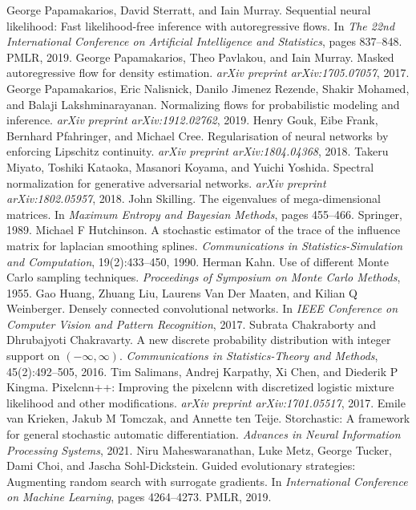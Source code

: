 \begin{chapterreferences}
 George Papamakarios, David Sterratt, and Iain Murray. Sequential neural likelihood: Fast likelihood-free inference with autoregressive flows. In \emph{The 22nd International Conference on Artificial Intelligence and Statistics}, pages 837--848. PMLR, 2019.
 George Papamakarios, Theo Pavlakou, and Iain Murray. Masked autoregressive flow for density estimation. \emph{arXiv preprint arXiv:1705.07057}, 2017.
 George Papamakarios, Eric Nalisnick, Danilo Jimenez Rezende, Shakir Mohamed, and Balaji Lakshminarayanan. Normalizing flows for probabilistic modeling and inference. \emph{arXiv preprint arXiv:1912.02762}, 2019.
 Henry Gouk, Eibe Frank, Bernhard Pfahringer, and Michael Cree. Regularisation of neural networks by enforcing Lipschitz continuity. \emph{arXiv preprint arXiv:1804.04368}, 2018.
 Takeru Miyato, Toshiki Kataoka, Masanori Koyama, and Yuichi Yoshida. Spectral normalization for generative adversarial networks. \emph{arXiv preprint arXiv:1802.05957}, 2018.
 John Skilling. The eigenvalues of mega-dimensional matrices. In \emph{Maximum Entropy and Bayesian Methods}, pages 455--466. Springer, 1989.
 Michael F Hutchinson. A stochastic estimator of the trace of the influence matrix for laplacian smoothing splines. \emph{Communications in Statistics-Simulation and Computation}, 19(2):433--450, 1990.
 Herman Kahn. Use of different Monte Carlo sampling techniques. \emph{Proceedings of Symposium on Monte Carlo Methods}, 1955.
 Gao Huang, Zhuang Liu, Laurens Van Der Maaten, and Kilian Q Weinberger. Densely connected convolutional networks. In \emph{IEEE Conference on Computer Vision and Pattern Recognition}, 2017.
 Subrata Chakraborty and Dhrubajyoti Chakravarty. A new discrete probability distribution with integer support on $(-\infty,\infty)$. \emph{Communications in Statistics-Theory and Methods}, 45(2):492--505, 2016.
 Tim Salimans, Andrej Karpathy, Xi Chen, and Diederik P Kingma. Pixelcnn++: Improving the pixelcnn with discretized logistic mixture likelihood and other modifications. \emph{arXiv preprint arXiv:1701.05517}, 2017.
 Emile van Krieken, Jakub M Tomczak, and Annette ten Teije. Storchastic: A framework for general stochastic automatic differentiation. \emph{Advances in Neural Information Processing Systems}, 2021.
 Niru Maheswaranathan, Luke Metz, George Tucker, Dami Choi, and Jascha Sohl-Dickstein. Guided evolutionary strategies: Augmenting random search with surrogate gradients. In \emph{International Conference on Machine Learning}, pages 4264--4273. PMLR, 2019.
\end{chapterreferences}
